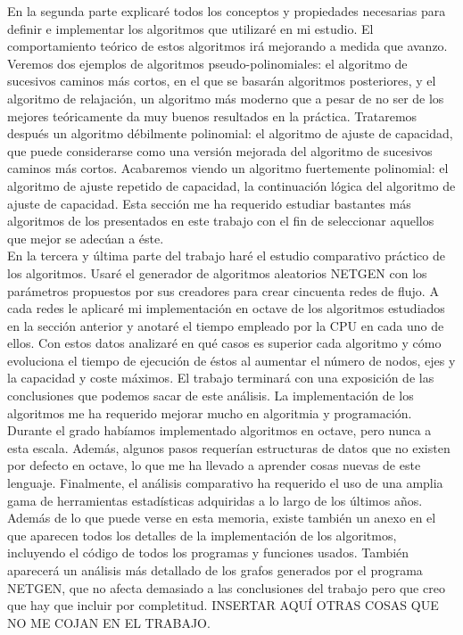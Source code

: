 En la segunda parte explicaré todos los conceptos y propiedades necesarias para definir e implementar los algoritmos que utilizaré en mi estudio.
El comportamiento teórico de estos algoritmos irá mejorando a medida que avanzo.
Veremos dos ejemplos de algoritmos pseudo-polinomiales: el algoritmo de sucesivos caminos más cortos, en el que se basarán algoritmos posteriores, y el algoritmo de relajación, un algoritmo más moderno que a pesar de no ser de los mejores teóricamente da muy buenos resultados en la práctica.
Trataremos después un algoritmo débilmente polinomial: el algoritmo de ajuste de capacidad, que puede considerarse como una versión mejorada del algoritmo de sucesivos caminos más cortos.
Acabaremos viendo un algoritmo fuertemente polinomial: el algoritmo de ajuste repetido de capacidad, la continuación lógica del algoritmo de ajuste de capacidad.
Esta sección me ha requerido estudiar bastantes más algoritmos de los presentados en este trabajo con el fin de seleccionar aquellos que mejor se adecúan a éste.\\

En la tercera y última parte del trabajo haré el estudio comparativo práctico de los algoritmos.
Usaré el generador de algoritmos aleatorios NETGEN con los parámetros propuestos por sus creadores para crear cincuenta redes de flujo.
A cada redes le aplicaré mi implementación en octave de los algoritmos estudiados en la sección anterior y anotaré el tiempo empleado por la CPU en cada uno de ellos.
Con estos datos analizaré en qué casos es superior cada algoritmo y cómo evoluciona el tiempo de ejecución de éstos al aumentar el número de nodos, ejes y la capacidad y coste máximos.
El trabajo terminará con una exposición de las conclusiones que podemos sacar de este análisis.
La implementación de los algoritmos me ha requerido mejorar mucho en algoritmia y programación.
Durante el grado habíamos implementado algoritmos en octave, pero nunca a esta escala.
Además, algunos pasos requerían estructuras de datos que no existen por defecto en octave, lo que me ha llevado a aprender cosas nuevas de este lenguaje.
Finalmente, el análisis comparativo ha requerido el uso de una amplia gama de herramientas estadísticas adquiridas a lo largo de los últimos años.\\

Además de lo que puede verse en esta memoria, existe también un anexo en el que aparecen todos los detalles de la implementación de los algoritmos, incluyendo el código de todos los programas y funciones usados.
También aparecerá un análisis más detallado de los grafos generados por el programa NETGEN, que no afecta demasiado a las conclusiones del trabajo pero que creo que hay que incluir por completitud.
INSERTAR AQUÍ OTRAS COSAS QUE NO ME COJAN EN EL TRABAJO.\\

